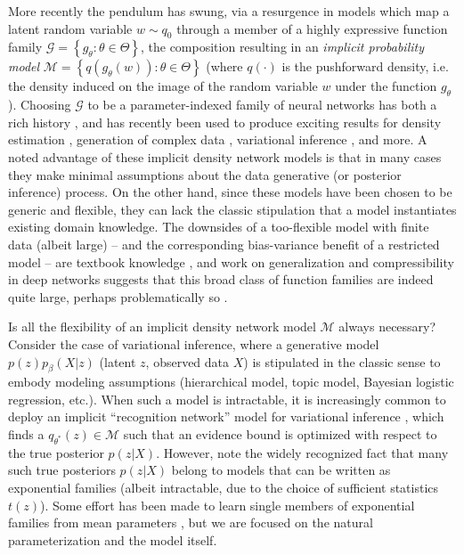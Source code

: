 \documentclass[twoside]{article}
\begin{document}
More recently the pendulum has swung, via a resurgence in models which map a latent random variable $w\sim q_0$ through a member of a highly expressive function family $\mathcal{G} = \left\{g_\theta : \theta \in \Theta\right\}$, the composition resulting in an \emph{implicit probability model} $\mathcal{M} = \left\{ q(g_\theta (w)) : \theta \in \Theta \right\}$ (where $q(\cdot)$ is the pushforward density, i.e. the density induced on the image of the random variable $w$ under the function $g_\theta$).  
Choosing $\mathcal{G}$ to be a parameter-indexed family of neural networks has both a rich history \cite{dayan1995helmholtz,mackay1997density}, and has recently been used to produce exciting results for density estimation \cite{uria2013rnade, rippel2013high, papamakarios2017masked}, generation of complex data \cite{Goodfellow:2014aa}, variational inference \cite{Kingma:2013aa, rezende2014stochastic, titsias2014doubly}, and more.  
A noted advantage of these implicit density network models is that in many cases they make minimal assumptions about the data generative (or posterior inference) process.  
On the other hand, since these models have been chosen to be generic and flexible, they can lack the classic stipulation that a model instantiates existing domain knowledge.  
The downsides of a too-flexible model with finite data (albeit large) -- and the corresponding bias-variance benefit of a restricted model -- are textbook knowledge \cite[\S 7.3]{friedman2001elements}, and work on generalization and compressibility in deep networks suggests that this broad class of function families are indeed quite large, perhaps problematically so \cite{zhou2018compressibility}.  

Is all the flexibility of an implicit density network model $\mathcal{M}$ always necessary?  
Consider the case of variational inference, where a generative model $p(z)p_\beta(X | z)$ (latent $z$, observed data $X$) is stipulated in the classic sense to embody modeling assumptions (hierarchical model, topic model, Bayesian logistic regression, etc.).  
When such a model is intractable, it is increasingly common to deploy an implicit ``recognition network'' model for variational inference \cite{Kingma:2013aa}, which finds a $q_{\theta^*}(z) \in \mathcal{M}$ such that an evidence bound is optimized with respect to the true posterior $p(z|X)$.  
However, note the widely recognized fact \cite{wainwright2008graphical} that many such true posteriors $p(z|X)$ belong to models that can be written as exponential families (albeit intractable, due to the choice of sufficient statistics $t(z)$). %
Some effort has been made to learn single members of exponential families from mean parameters \cite{loaiza2017maximum}, but we are focused on the natural parameterization and the model itself. 
\end{document}
